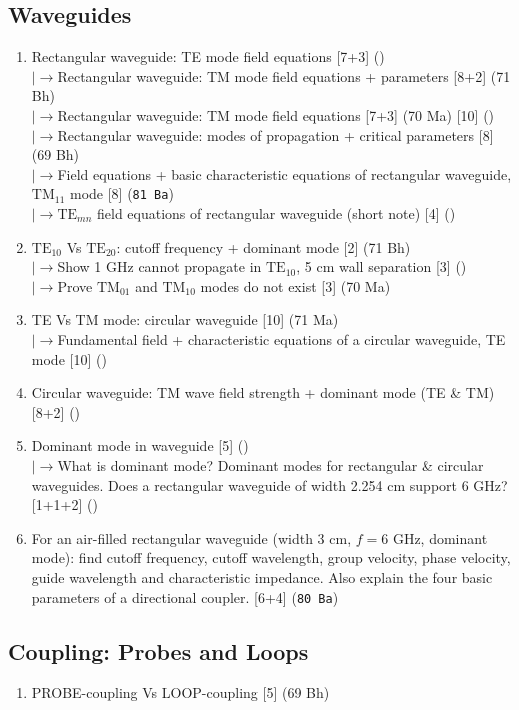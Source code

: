 \documentclass[12pt]{article}
\newcommand{\lb}{\\$\left|\rightarrow\right.$}
\begin{document}
  \subsection{Waveguides}
    \begin{enumerate}[topsep=0pt, noitemsep]
      \item Rectangular waveguide: TE mode field equations \hfill [7+3] ()
        \lb Rectangular waveguide: TM mode field equations + parameters \hfill [8+2] (71 Bh)
        \lb Rectangular waveguide: TM mode field equations \hfill [7+3] (70 Ma) [10] ()
        \lb Rectangular waveguide: modes of propagation + critical parameters \hfill [8] (69 Bh)
        \lb Field equations + basic characteristic equations of rectangular waveguide, $\text{TM}_{11}$ mode \hfill [8] (\texttt{81 Ba})
        \lb $\text{TE}_{mn}$ field equations of rectangular waveguide (short note) \hfill [4] ()
      \item $\text{TE}_{10}$ Vs $\text{TE}_{20}$: cutoff frequency + dominant mode \hfill [2] (71 Bh)
        \lb Show 1 GHz cannot propagate in $\text{TE}_{10}$, 5 cm wall separation \hfill [3] ()
        \lb Prove $\text{TM}_{01}$ and $\text{TM}_{10}$ modes do not exist \hfill [3] (70 Ma)
      \item TE Vs TM mode: circular waveguide \hfill [10] (71 Ma)
        \lb Fundamental field + characteristic equations of a circular waveguide, TE mode \hfill [10] ()
      \item Circular waveguide: TM wave field strength + dominant mode (TE \& TM) \hfill [8+2] ()
      \item Dominant mode in waveguide \hfill [5] ()
        \lb What is dominant mode? Dominant modes for rectangular \& circular waveguides. Does a rectangular waveguide of width 2.254 cm support 6 GHz? \hfill [1+1+2] ()
      \item For an air-filled rectangular waveguide (width 3 cm, $f=6$ GHz, dominant mode): find cutoff frequency, cutoff wavelength, group velocity, phase velocity, guide wavelength and characteristic impedance. Also explain the four basic parameters of a directional coupler. \hfill [6+4] (\texttt{80 Ba})
    \end{enumerate}

  \subsection{Coupling: Probes and Loops}
    \begin{enumerate}[topsep=0pt, noitemsep]
      \item PROBE-coupling Vs LOOP-coupling \hfill [5] (69 Bh)
    \end{enumerate}
\end{document}
